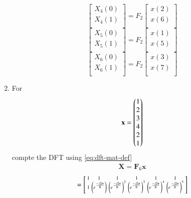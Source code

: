 \documentclass[journal,12pt,twocolumn]{IEEEtran}
\let\vec\mathbf
\renewcommand\thesection{\arabic{section}}
\begin{document}
\begin{enumerate}[label=\arabic*.,ref=\thesection.\theenumi]
\begin{equation}
	\begin{bmatrix}
		X_{4}(0) \\ 
		X_{4}(1)\\ 
	\end{bmatrix}
	= F_{2}
	\begin{bmatrix}
		x(2) \\ 
		x(6) \\ 
	\end{bmatrix}
\end{equation}
\begin{equation}
	\begin{bmatrix}
		X_{5}(0) \\ 
		X_{5}(1)\\ 
	\end{bmatrix}
	= F_{2}
	\begin{bmatrix}
		x(1) \\ 
		x(5) \\ 
	\end{bmatrix}
\end{equation}
\begin{equation}
	\begin{bmatrix}
		X_{6}(0) \\ 
		X_{6}(1)\\ 
	\end{bmatrix}
	= F_{2}
	\begin{bmatrix}
		x(3) \\ 
		x(7) \\ 
	\end{bmatrix}
\end{equation}
\item For 
\begin{align}
	\vec{x} = \myvec{1\\2\\3\\4\\2\\1}
	\label{eq:equation1}
\end{align}
compte the DFT  
using 
\eqref{eq:dft-mat-def}\\
\solution
\begin{align}
	\vec{X} = \vec{F}_6 \vec{x}
\end{align}	
\begin{align}
	= \begin{bsmallmatrix}
		1	&	1	&	1	&	1	&	1	&	1\\
		1	&	\brak{e^{\frac{-j2\pi}{6}}}	&	\brak{e^{\frac{-j2\pi}{6}}}^2	&	\brak{e^{\frac{-j2\pi}{6}}}^3	&	\brak{e^{\frac{-j2\pi}{6}}}^4	&	\brak{e^{\frac{-j2\pi}{6}}}^5\\

\end{bsmallmatrix}
\end{align}
\end{enumerate}
\end{document}
